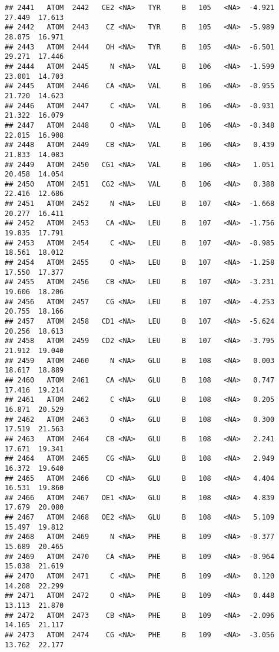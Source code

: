 \documentclass[
]{article}
\begin{document}
\begin{verbatim}
## 2441   ATOM  2442   CE2 <NA>   TYR     B   105   <NA>  -4.921  27.449  17.613
## 2442   ATOM  2443    CZ <NA>   TYR     B   105   <NA>  -5.989  28.075  16.971
## 2443   ATOM  2444    OH <NA>   TYR     B   105   <NA>  -6.501  29.271  17.446
## 2444   ATOM  2445     N <NA>   VAL     B   106   <NA>  -1.599  23.001  14.703
## 2445   ATOM  2446    CA <NA>   VAL     B   106   <NA>  -0.955  21.720  14.623
## 2446   ATOM  2447     C <NA>   VAL     B   106   <NA>  -0.931  21.322  16.079
## 2447   ATOM  2448     O <NA>   VAL     B   106   <NA>  -0.348  22.015  16.908
## 2448   ATOM  2449    CB <NA>   VAL     B   106   <NA>   0.439  21.833  14.083
## 2449   ATOM  2450   CG1 <NA>   VAL     B   106   <NA>   1.051  20.458  14.054
## 2450   ATOM  2451   CG2 <NA>   VAL     B   106   <NA>   0.388  22.416  12.686
## 2451   ATOM  2452     N <NA>   LEU     B   107   <NA>  -1.668  20.277  16.411
## 2452   ATOM  2453    CA <NA>   LEU     B   107   <NA>  -1.756  19.835  17.791
## 2453   ATOM  2454     C <NA>   LEU     B   107   <NA>  -0.985  18.561  18.012
## 2454   ATOM  2455     O <NA>   LEU     B   107   <NA>  -1.258  17.550  17.377
## 2455   ATOM  2456    CB <NA>   LEU     B   107   <NA>  -3.231  19.606  18.206
## 2456   ATOM  2457    CG <NA>   LEU     B   107   <NA>  -4.253  20.755  18.166
## 2457   ATOM  2458   CD1 <NA>   LEU     B   107   <NA>  -5.624  20.256  18.613
## 2458   ATOM  2459   CD2 <NA>   LEU     B   107   <NA>  -3.795  21.912  19.040
## 2459   ATOM  2460     N <NA>   GLU     B   108   <NA>   0.003  18.617  18.889
## 2460   ATOM  2461    CA <NA>   GLU     B   108   <NA>   0.747  17.416  19.214
## 2461   ATOM  2462     C <NA>   GLU     B   108   <NA>   0.205  16.871  20.529
## 2462   ATOM  2463     O <NA>   GLU     B   108   <NA>   0.300  17.519  21.563
## 2463   ATOM  2464    CB <NA>   GLU     B   108   <NA>   2.241  17.671  19.341
## 2464   ATOM  2465    CG <NA>   GLU     B   108   <NA>   2.949  16.372  19.640
## 2465   ATOM  2466    CD <NA>   GLU     B   108   <NA>   4.404  16.531  19.860
## 2466   ATOM  2467   OE1 <NA>   GLU     B   108   <NA>   4.839  17.679  20.080
## 2467   ATOM  2468   OE2 <NA>   GLU     B   108   <NA>   5.109  15.497  19.812
## 2468   ATOM  2469     N <NA>   PHE     B   109   <NA>  -0.377  15.689  20.465
## 2469   ATOM  2470    CA <NA>   PHE     B   109   <NA>  -0.964  15.038  21.619
## 2470   ATOM  2471     C <NA>   PHE     B   109   <NA>   0.120  14.208  22.299
## 2471   ATOM  2472     O <NA>   PHE     B   109   <NA>   0.448  13.113  21.870
## 2472   ATOM  2473    CB <NA>   PHE     B   109   <NA>  -2.096  14.165  21.117
## 2473   ATOM  2474    CG <NA>   PHE     B   109   <NA>  -3.056  13.762  22.177

\end{verbatim}
\end{document}

